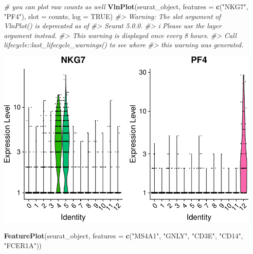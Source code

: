 \documentclass[
]{book}
\newenvironment{Shaded}{\begin{snugshade}}{\end{snugshade}}
\newcommand{\AttributeTok}[1]{\textcolor[rgb]{0.13,0.29,0.53}{#1}}
\newcommand{\CommentTok}[1]{\textcolor[rgb]{0.56,0.35,0.01}{\textit{#1}}}
\newcommand{\ConstantTok}[1]{\textcolor[rgb]{0.56,0.35,0.01}{#1}}
\newcommand{\FunctionTok}[1]{\textcolor[rgb]{0.13,0.29,0.53}{\textbf{#1}}}
\newcommand{\NormalTok}[1]{#1}
\newcommand{\StringTok}[1]{\textcolor[rgb]{0.31,0.60,0.02}{#1}}
\begin{document}
\begin{Shaded}
\begin{Highlighting}[]
\CommentTok{\# you can plot raw counts as well}
\FunctionTok{VlnPlot}\NormalTok{(seurat\_object, }\AttributeTok{features =} \FunctionTok{c}\NormalTok{(}\StringTok{"NKG7"}\NormalTok{, }\StringTok{"PF4"}\NormalTok{), }\AttributeTok{slot =} \StringTok{\textquotesingle{}counts\textquotesingle{}}\NormalTok{, }\AttributeTok{log =} \ConstantTok{TRUE}\NormalTok{)}
\CommentTok{\#\textgreater{} Warning: The \textasciigrave{}slot\textasciigrave{} argument of \textasciigrave{}VlnPlot()\textasciigrave{} is deprecated as of}
\CommentTok{\#\textgreater{} Seurat 5.0.0.}
\CommentTok{\#\textgreater{} i Please use the \textasciigrave{}layer\textasciigrave{} argument instead.}
\CommentTok{\#\textgreater{} This warning is displayed once every 8 hours.}
\CommentTok{\#\textgreater{} Call \textasciigrave{}lifecycle::last\_lifecycle\_warnings()\textasciigrave{} to see where}
\CommentTok{\#\textgreater{} this warning was generated.}
\end{Highlighting}
\end{Shaded}

\includegraphics{scRNAseqInR_ABACBS_2024_Doco_files/figure-latex/unnamed-chunk-25-2.pdf}

\begin{Shaded}
\begin{Highlighting}[]
\FunctionTok{FeaturePlot}\NormalTok{(seurat\_object, }\AttributeTok{features =} \FunctionTok{c}\NormalTok{(}\StringTok{"MS4A1"}\NormalTok{, }\StringTok{"GNLY"}\NormalTok{, }\StringTok{"CD3E"}\NormalTok{, }\StringTok{"CD14"}\NormalTok{, }\StringTok{"FCER1A"}\NormalTok{))}
\end{Highlighting}
\end{Shaded}
\end{document}
